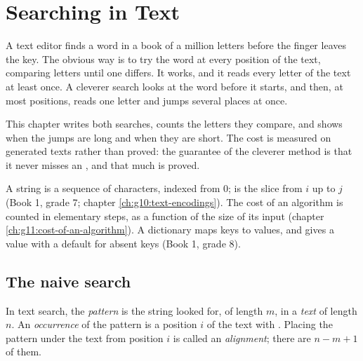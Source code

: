 \chapter{Searching in Text}\label{ch:g12:text-search}

A text editor finds a word in a book of a million letters before the finger leaves the key. The obvious way is to
try the word at every position of the text, comparing letters until one differs. It works, and it reads every
letter of the text at least once. A cleverer search looks at the word before it starts, and then, at most positions,
reads one letter and jumps several places at once.

This chapter writes both searches, counts the letters they compare, and shows when the jumps are long and when they
are short. The cost is measured on generated texts rather than proved: the guarantee of the cleverer method is that
it never misses an , and that much is proved.

\begin{recall}
A string is a sequence of characters, indexed from $0$;  is the slice from $i$ up to $j$ (Book 1, grade
7; chapter \ref{ch:g10:text-encodings}). The cost of an algorithm is counted in elementary steps, as a function of the
size of its input (chapter \ref{ch:g11:cost-of-an-algorithm}). A dictionary maps keys to values, and  gives a value with a default for absent keys (Book 1, grade 8).
\end{recall}

\section{The naive search}\label{sec:g12:text-search:naive}

\begin{definition}\label{def:g12:text-search:pattern}
In text search, the \emph{pattern} is the string looked for, of length $m$, in a
\emph{text} of length $n$. An \emph{occurrence} of the pattern is a position $i$ of the text with
. Placing the pattern under the text from position $i$ is called an \emph{alignment}; there
are $n - m + 1$ of them.
\end{definition}

